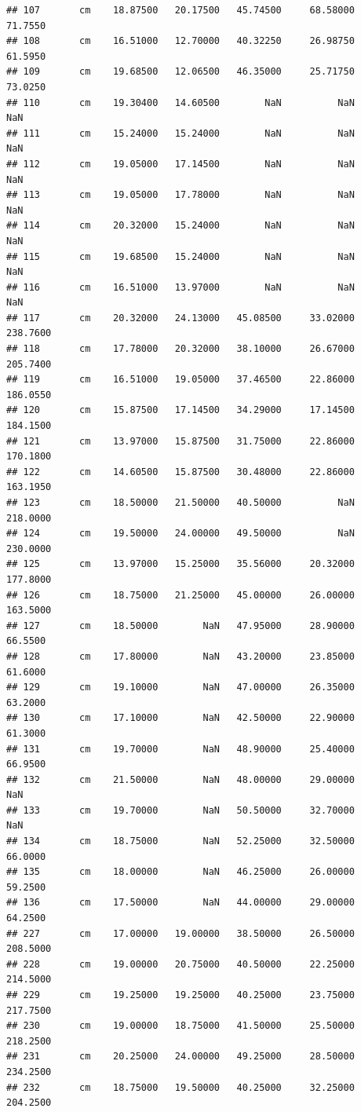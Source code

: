 \documentclass[]{article}
\begin{document}
\begin{verbatim}
## 107       cm    18.87500   20.17500   45.74500     68.58000   71.7550
## 108       cm    16.51000   12.70000   40.32250     26.98750   61.5950
## 109       cm    19.68500   12.06500   46.35000     25.71750   73.0250
## 110       cm    19.30400   14.60500        NaN          NaN       NaN
## 111       cm    15.24000   15.24000        NaN          NaN       NaN
## 112       cm    19.05000   17.14500        NaN          NaN       NaN
## 113       cm    19.05000   17.78000        NaN          NaN       NaN
## 114       cm    20.32000   15.24000        NaN          NaN       NaN
## 115       cm    19.68500   15.24000        NaN          NaN       NaN
## 116       cm    16.51000   13.97000        NaN          NaN       NaN
## 117       cm    20.32000   24.13000   45.08500     33.02000  238.7600
## 118       cm    17.78000   20.32000   38.10000     26.67000  205.7400
## 119       cm    16.51000   19.05000   37.46500     22.86000  186.0550
## 120       cm    15.87500   17.14500   34.29000     17.14500  184.1500
## 121       cm    13.97000   15.87500   31.75000     22.86000  170.1800
## 122       cm    14.60500   15.87500   30.48000     22.86000  163.1950
## 123       cm    18.50000   21.50000   40.50000          NaN  218.0000
## 124       cm    19.50000   24.00000   49.50000          NaN  230.0000
## 125       cm    13.97000   15.25000   35.56000     20.32000  177.8000
## 126       cm    18.75000   21.25000   45.00000     26.00000  163.5000
## 127       cm    18.50000        NaN   47.95000     28.90000   66.5500
## 128       cm    17.80000        NaN   43.20000     23.85000   61.6000
## 129       cm    19.10000        NaN   47.00000     26.35000   63.2000
## 130       cm    17.10000        NaN   42.50000     22.90000   61.3000
## 131       cm    19.70000        NaN   48.90000     25.40000   66.9500
## 132       cm    21.50000        NaN   48.00000     29.00000       NaN
## 133       cm    19.70000        NaN   50.50000     32.70000       NaN
## 134       cm    18.75000        NaN   52.25000     32.50000   66.0000
## 135       cm    18.00000        NaN   46.25000     26.00000   59.2500
## 136       cm    17.50000        NaN   44.00000     29.00000   64.2500
## 227       cm    17.00000   19.00000   38.50000     26.50000  208.5000
## 228       cm    19.00000   20.75000   40.50000     22.25000  214.5000
## 229       cm    19.25000   19.25000   40.25000     23.75000  217.7500
## 230       cm    19.00000   18.75000   41.50000     25.50000  218.2500
## 231       cm    20.25000   24.00000   49.25000     28.50000  234.2500
## 232       cm    18.75000   19.50000   40.25000     32.25000  204.2500

\end{verbatim}
\end{document}
